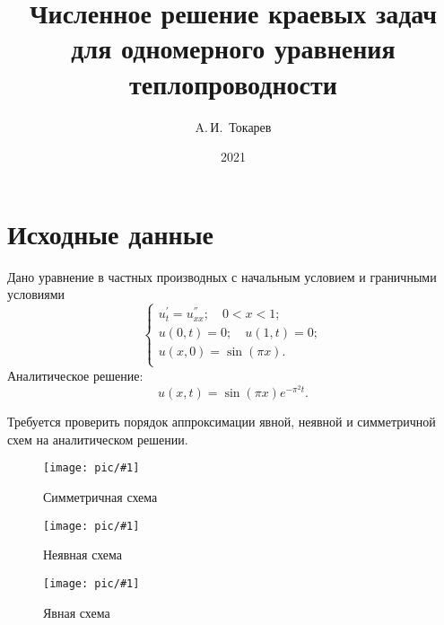 \documentclass[12pt, a4paper]{article}
\title{Численное решение краевых задач для одномерного уравнения теплопроводности}
\author{A.\,И.~Токарев}
\date{2021}
\newcommand{\Picture}[4]
{
\begin{figure}[H]
\noindent 
\centering\texttt{[image: pic/\#1]}
\caption{#3}
\label{#4}
\end{figure}
}
\begin{document}
\maketitle
\tableofcontents 
\newpage

\section{Исходные данные}
Дано уравнение в частных производных с начальным условием и граничными условиями
\[
\begin{cases}
u^'_t=u^{''}_{xx}; \quad 0 < x < 1; \\
u(0, t) = 0; \quad u(1 , t) = 0;\\
u(x,0) = \sin(\pi x).\\
\end{cases}
\]
Аналитическое решение: 
\[
u(x,t) = \sin (\pi x) e^{-\pi^2 t}.
\]

Требуется проверить порядок аппроксимации явной, неявной и симметричной схем на аналитическом решении.

\Picture{sim.png}{0.5}{Симметричная схема}{}
\Picture{imp.png}{0.5}{Неявная схема}{}
\Picture{exp.png}{0.5}{Явная схема}{}




\newpage
\end{document}
